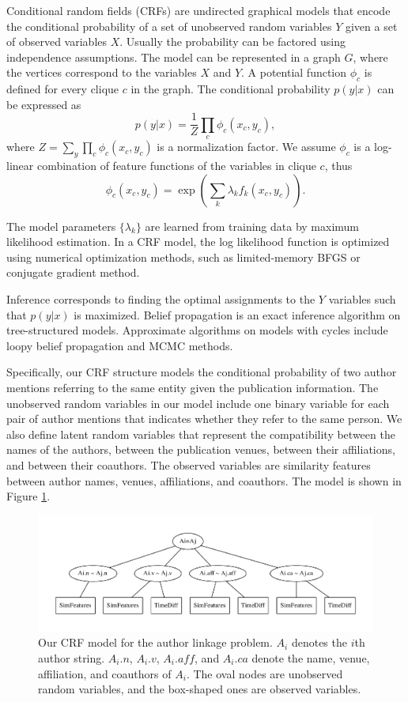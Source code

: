 \documentclass[twocolumn,letterpaper]{article}
\begin{document}
Conditional random fields (CRFs) are undirected graphical models that encode the conditional probability of a set of unobserved random variables $Y$ given a set of observed variables $X$.  Usually the probability can be factored using independence assumptions.  The model can be represented in a graph $G$, where the vertices correspond to the variables $X$ and $Y$.  A potential function $\phi_c$ is defined for every clique $c$ in the graph.  The conditional probability $p(y|x)$ can be expressed as
$$p(y|x)=\frac{1}{Z}\prod_c \phi_c(x_c,y_c),$$
where $Z=\sum_y\prod_c \phi_c(x_c,y_c)$ is a normalization factor.  We assume $\phi_c$ is a log-linear combination of feature functions of the variables in clique $c$, thus
$$\phi_c(x_c,y_c)=\exp\left(\sum_k \lambda_k f_k(x_c,y_c)\right).$$

The model parameters $\{\lambda_k\}$ are learned from training data by
maximum likelihood estimation.  In a CRF model, the log likelihood
function is optimized using numerical optimization methods, such as
limited-memory BFGS or conjugate gradient method.

Inference corresponds to finding the optimal assignments to the $Y$
variables such that $p(y|x)$ is maximized.  Belief propagation is an
exact inference algorithm on tree-structured models.  Approximate
algorithms on models with cycles include loopy belief propagation and
MCMC methods.



Specifically, our CRF structure models the conditional probability of
two author mentions referring to the same entity given the publication
information.  The unobserved random variables in our model include one
binary variable for each pair of author mentions that indicates
whether they refer to the same person.  We also define latent random
variables that represent the compatibility between the names of the
authors, between the publication venues, between their affiliations,
and between their coauthors.  The observed variables are similarity
features between author names, venues, affiliations, and coauthors.
The model is shown in Figure \ref{fig:crf}.

\begin{figure}
\centering
\includegraphics[width=\textwidth]{crf}
\caption{Our CRF model for the author linkage problem.  $A_i$ denotes
  the $i$th author string.  $A_i.n$, $A_i.v$, $A_i.aff$, and $A_i.ca$
  denote the name, venue, affiliation, and coauthors of $A_i$.  The
  oval nodes are unobserved random variables, and the box-shaped ones
  are observed variables.}
\label{fig:crf}
\end{figure}
\end{document}
